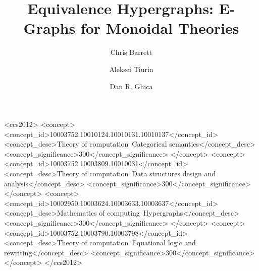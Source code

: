 \documentclass[acmsmall,screen, nonacm]{acmart}
\begin{document}
\title{Equivalence Hypergraphs: E-Graphs for Monoidal Theories}

\author{Chris Barrett}

\author{Aleksei Tiurin}

\author{Dan R. Ghica}



\begin{abstract}

\end{abstract}


\begin{CCSXML}
<ccs2012>
   <concept>
       <concept_id>10003752.10010124.10010131.10010137</concept_id>
       <concept_desc>Theory of computation~Categorical semantics</concept_desc>
       <concept_significance>300</concept_significance>
       </concept>
   <concept>
       <concept_id>10003752.10003809.10010031</concept_id>
       <concept_desc>Theory of computation~Data structures design and analysis</concept_desc>
       <concept_significance>300</concept_significance>
       </concept>
   <concept>
       <concept_id>10002950.10003624.10003633.10003637</concept_id>
       <concept_desc>Mathematics of computing~Hypergraphs</concept_desc>
       <concept_significance>300</concept_significance>
       </concept>
   <concept>
       <concept_id>10003752.10003790.10003798</concept_id>
       <concept_desc>Theory of computation~Equational logic and rewriting</concept_desc>
       <concept_significance>300</concept_significance>
       </concept>
 </ccs2012>
\end{CCSXML}


\end{document}
